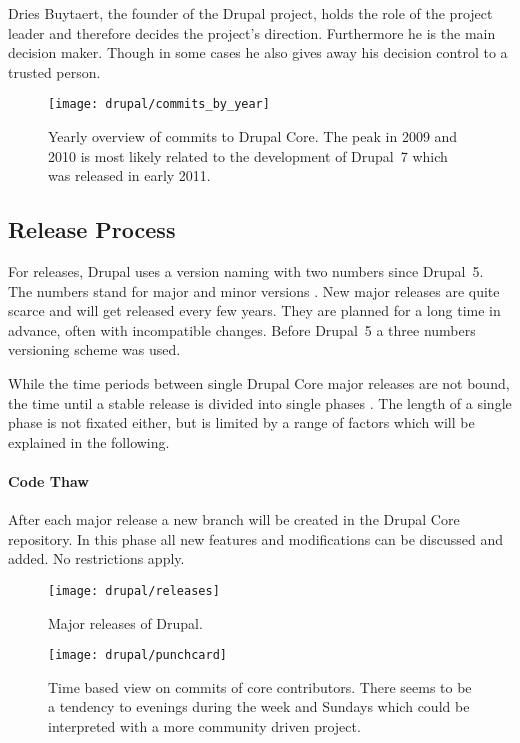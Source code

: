 Dries Buytaert, the founder of the Drupal project, holds the role of the
project leader and therefore decides the project's direction. Furthermore he is
the main decision maker. Though in some cases he also gives away his decision
control to a trusted person.

\begin{figure}[htbp]
  \centering
  \texttt{[image: drupal/commits\_by\_year]}
  \caption[Commits by Year, Drupal]
  {Yearly overview of commits to Drupal Core. The peak in 2009 and 2010 is most
    likely related to the development of Drupal~7 which was released in early
    2011.}
  \label{fig:drupal:cby}
\end{figure}


\subsection{Release Process} %

For releases, Drupal uses a version naming with two numbers since Drupal~5. The
numbers stand for major and minor versions \cite{DrupalUpgrade}. New major
releases are quite scarce and will get released every few years. They are
planned for a long time in advance, often with incompatible changes. Before
Drupal~5 a three numbers versioning scheme was used.

While the time periods between single Drupal Core major releases are not bound,
the time until a stable release is divided into single phases
\cite{DrupalReleaseCycle}. The length of a single phase is not fixated either,
but is limited by a range of factors which will be explained in the following.

\paragraph{Code Thaw}

After each major release a new branch will be created in the Drupal Core
repository. In this phase all new features and modifications can be discussed
and added. No restrictions apply.

\begin{figure}[bhtp]
  \centering
  \texttt{[image: drupal/releases]}
  \caption[Major Releases of Drupal]{Major releases of Drupal.}
\end{figure}

\begin{figure}[htbp]
  \centering
  \texttt{[image: drupal/punchcard]}
  \caption[Time Based View on Commits, Drupal]
  {Time based view on commits of core contributors. There seems to be a
    tendency to evenings during the week and Sundays which could be interpreted
    with a more community driven project.}
  \label{fig:drupal:p}
\end{figure}

